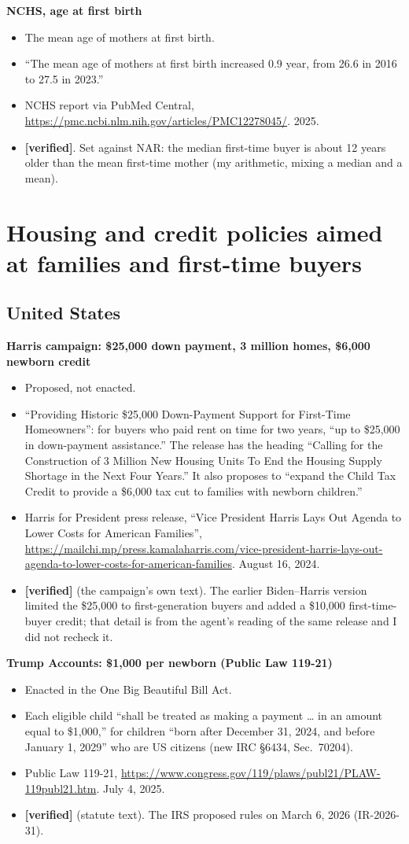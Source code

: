 \documentclass[10pt]{article}
\newcommand{\ok}{\textcolor{green!45!black}{\textbf{[verified]}}}
\newcommand{\entry}[5]{%
  \textbf{#1}\par
  \begin{itemize}
    \item #2
    \item #3
    \item #4
    \item #5
  \end{itemize}}
\begin{document}
\entry{NCHS, age at first birth}
{The mean age of mothers at first birth.}
{``The mean age of mothers at first birth increased 0.9 year, from 26.6 in 2016 to 27.5 in 2023.''}
{NCHS report via PubMed Central, \url{https://pmc.ncbi.nlm.nih.gov/articles/PMC12278045/}. 2025.}
{\ok. Set against NAR: the median first-time buyer is about 12 years older than the mean first-time mother (my arithmetic, mixing a median and a mean).}

\section{Housing and credit policies aimed at families and first-time buyers}
\subsection*{United States}

\entry{Harris campaign: \$25,000 down payment, 3 million homes, \$6,000 newborn credit}
{Proposed, not enacted.}
{``Providing Historic \$25,000 Down-Payment Support for First-Time Homeowners'': for buyers who paid rent on time for two years, ``up to \$25,000 in down-payment assistance.'' The release has the heading ``Calling for the Construction of 3 Million New Housing Units To End the Housing Supply Shortage in the Next Four Years.'' It also proposes to ``expand the Child Tax Credit to provide a \$6,000 tax cut to families with newborn children.''}
{Harris for President press release, ``Vice President Harris Lays Out Agenda to Lower Costs for American Families'', \url{https://mailchi.mp/press.kamalaharris.com/vice-president-harris-lays-out-agenda-to-lower-costs-for-american-families}. August 16, 2024.}
{\ok{} (the campaign's own text). The earlier Biden--Harris version limited the \$25,000 to first-generation buyers and added a \$10,000 first-time-buyer credit; that detail is from the agent's reading of the same release and I did not recheck it.}

\entry{Trump Accounts: \$1,000 per newborn (Public Law 119-21)}
{Enacted in the One Big Beautiful Bill Act.}
{Each eligible child ``shall be treated as making a payment \ldots{} in an amount equal to \$1,000,'' for children ``born after December 31, 2024, and before January 1, 2029'' who are US citizens (new IRC \S6434, Sec.~70204).}
{Public Law 119-21, \url{https://www.congress.gov/119/plaws/publ21/PLAW-119publ21.htm}. July 4, 2025.}
{\ok{} (statute text). The IRS proposed rules on March 6, 2026 (IR-2026-31).}
\end{document}
